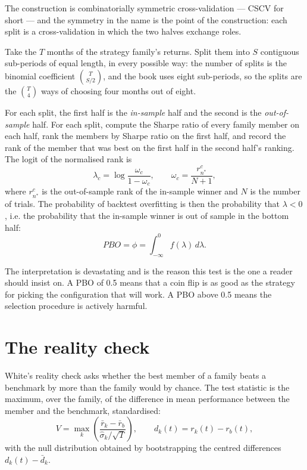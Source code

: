 The construction is combinatorially symmetric cross-validation --- CSCV for
short --- and the symmetry in the name is the point of the construction:
each split is a cross-validation in which the two halves exchange roles.

Take the \(T\) months of the strategy family's returns. Split them into
\(S\) contiguous sub-periods of equal length, in every possible way: the
number of splits is the binomial coefficient
\(\binom{T}{S/2}\), and the book uses eight sub-periods, so the splits
are the \(\binom{T}{4}\) ways of choosing four months out of eight.

For each split, the first half is the \emph{in-sample} half and the
second is the \emph{out-of-sample} half. For each split, compute the
Sharpe ratio of every family member on each half, rank the members by
Sharpe ratio on the first half, and record the rank of the member that
was best on the first half in the second half's ranking. The logit of the
normalised rank is
\begin{equation}
\lambda_c = \log\frac{\omega_c}{1-\omega_c},
\qquad
\omega_c = \frac{r^c_{n^*}}{N+1},
\end{equation}
where \(r^c_{n^*}\) is the out-of-sample rank of the in-sample winner and
\(N\) is the number of trials. The probability of backtest overfitting is
then the probability that \(\lambda < 0\), i.e. the probability that the
in-sample winner is out of sample in the bottom half:
\begin{equation}
PBO = \phi = \int_{-\infty}^{0} f(\lambda)\,d\lambda .
\end{equation}

The interpretation is devastating and is the reason this test is the one
a reader should insist on. A PBO of 0.5 means that a coin flip is as good
as the strategy for picking the configuration that will work. A PBO
above 0.5 means the selection procedure is actively harmful.

\section{The reality check}

White's reality check asks whether the best member of a family beats a
benchmark by more than the family would by chance. The test statistic is
the maximum, over the family, of the difference in mean performance
between the member and the benchmark, standardised:
\begin{equation}
V = \max_k \left(
  \frac{\bar{r}_{k} - \bar{r}_{b}}
       {\hat{\sigma}_{k}/\sqrt{T}}
  \right),
\qquad
d_k(t) = r_k(t) - r_b(t),
\end{equation}
with the null distribution obtained by bootstrapping the centred
differences \(d_k(t) - \bar{d}_k\).

